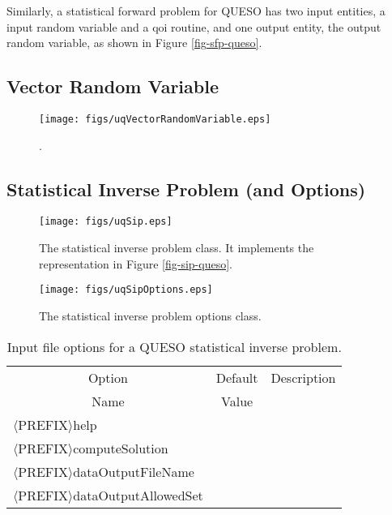 Similarly, a statistical forward problem for QUESO has two input entities, a input random variable and
a qoi routine, and one output entity, the output random variable, as shown in Figure \ref{fig-sfp-queso}.

\clearpage
\subsection{Vector Random Variable}

\begin{figure}[h!]
\centerline{
\texttt{[image: figs/uqVectorRandomVariable.eps]}
}
\caption{
{\color{red}{The class diagram for the vector random variable class}}.
}
\label{fig-vector-rv-class}
\end{figure}

\clearpage
\subsection{Statistical Inverse Problem (and Options)}

\begin{figure}[h!]
\centerline{
\texttt{[image: figs/uqSip.eps]}
}
\caption{
The statistical inverse problem class. It implements the representation in Figure \ref{fig-sip-queso}.
}
\label{fig-sip-class}
\end{figure}

\begin{figure}[h!]
\begin{center}
\texttt{[image: figs/uqSipOptions.eps]}
\end{center}
\caption{
The statistical inverse problem options class.
}
\label{fig-sip-options-class}
\end{figure}

\begin{table}[!h]
\begin{center}
\begin{tabular}{|l|c|c|}
\hline
\multicolumn{1}{|c|}{Option}                 & Default & Description \\
\multicolumn{1}{|c|}{Name}                   & Value   &             \\
\hline
\hline
$\langle$PREFIX$\rangle$help                 &         &             \\
\hline
$\langle$PREFIX$\rangle$computeSolution      &         &             \\
\hline
$\langle$PREFIX$\rangle$dataOutputFileName   &         &             \\
\hline
$\langle$PREFIX$\rangle$dataOutputAllowedSet &         &             \\
\hline
\end{tabular}
\end{center}
\caption{
Input file options for a QUESO statistical inverse problem.
}
\label{tab-sip-options}
\end{table}

